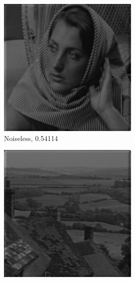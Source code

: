 \documentclass[a4paper]{article}
\begin{document}
\begin{figure}[H]
\begin{subfigure}{0.24\linewidth}
        \includegraphics[width = \linewidth]{dct2D/barbara256 reconstructed using compressive measurements, without noise.png}
        \caption{Noiseless, 0.54114}
    \end{subfigure}
    \begin{subfigure}{0.24\linewidth}
        \centering
        \includegraphics[width = \linewidth]{dct2D/goldhill reconstructed using compressive measurements, with noise.png}

\end{subfigure}
\end{figure}
\end{document}
